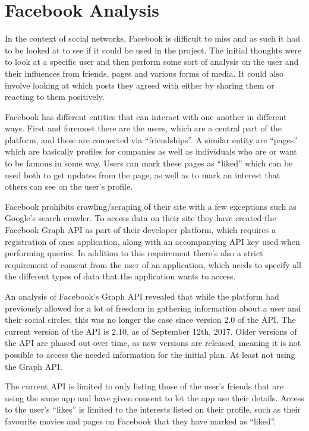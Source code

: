 \chapter{Facebook Analysis}\label{chap:facebook-analysis}
In the context of social networks, Facebook is difficult to miss
\citep{FacebookPopularity} and as such it had to be looked at to see if it could be used in the project.
The initial thoughts were to look at a specific user and then perform some sort of analysis on the user and their
influences from friends, pages and various forms of media.
It could also involve looking at which posts they agreed with either by sharing them or reacting to them positively.\nl

Facebook has different entities that can interact with one another in different ways.
First and foremost there are the users, which are a central part of the platform, and these are connected via
``friendships''.
A similar entity are ``pages'' which are basically profiles for companies as well as individuals who are or want to be
famous in some way.
Users can mark these pages as ``liked'' which can be used both to get updates from the page, as well as to mark an
interest that others can see on the user's profile.\nl

Facebook prohibits crawling/scraping of their site with a few exceptions such as Google's search crawler.
To access data on their site they have created the Facebook Graph API as part of their developer platform, which
requires a registration of ones application, along with an accompanying API key used when performing queries.
In addition to this requirement there's also a strict requirement of consent from the user of an application, which
needs to specify all the different types of data that the application wants to access.\nl

An analysis of Facebook's Graph API revealed that while the platform had previously allowed for a lot of freedom in
gathering information about a user and their social circles, this was no longer the case since version 2.0 of the API.
The current version of the API is 2.10, as of September 12th, 2017.
Older versions of the API are phased out over time, as new versions are released, meaning it is not possible to access
the needed information for the initial plan.
At least not using the Graph API.\nl

The current API is limited to only listing those of the user's friends that are using the same app and have given
consent to let the app use their details.
Access to the user's ``likes'' is limited to the interests listed on their profile, such as their favourite movies and
pages on Facebook that they have marked as ``liked''.\nl

